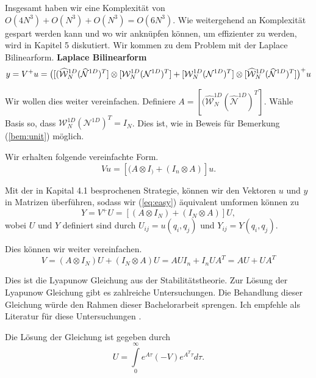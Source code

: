 Insgesamt haben wir eine Komplexität von $O(4N^3)+O(N^3)+O(N^3)=O(6N^3)$.
Wie weitergehend an Komplexität gespart werden kann und wo wir anknüpfen können, um effizienter zu werden, wird in Kapitel 5 diskutiert.
Wir kommen zu dem Problem mit der Laplace Bilinearform.
\vspace*{1cm}
\textbf{Laplace Bilinearform}
\begin{equation*}
y=V^{+}u = \big{(} [(\widehat{\mathcal{W}}_N^{1D} (\widehat{\mathcal{N}}^{1D})^T] \otimes [\mathcal{W}_N^{1D} (\mathcal{N}^{1D})^T]  +  [\mathcal{W}_N^{1D} (\mathcal{N}^{1D})^T] \otimes [\widehat{\mathcal{W}}_N^{1D} (\widehat{\mathcal{N}}^{1D})^T]  \big{)}^+ u
\end{equation*}

Wir wollen dies weiter vereinfachen. Definiere $A=[(\widehat{\mathcal{W}}_N^{1D} (\widehat{\mathcal{N}}^{1D})^T]$. Wähle Basis so, dass $\mathcal{W}_N^{1D} (\mathcal{N}^{1D})^T  = I_N$. Dies ist, wie in Beweis für Bemerkung (\ref{bem:unit}) möglich.

Wir erhalten folgende vereinfachte Form.
\begin{equation*} \label{eq:easy}
Vu =[(A \otimes I_) + (I_n \otimes A)]u.
\end{equation*}

Mit der in Kapital 4.1 besprochenen Strategie, können wir den Vektoren $u$ und $y$ in Matrizen überführen, sodass wir (\ref{eq:easy}) äquivalent umformen können zu
\begin{equation*} \label{eq:easy}
Y=V^{+}U =[(A \otimes I_N) + (I_N \otimes A)]U,
\end{equation*}
wobei $U$  und $Y$ definiert sind durch $U_{ij}=u(q_i,q_j)$ und $Y_{ij}=Y(q_i,q_j)$.

Dies können wir weiter vereinfachen.
\begin{equation*} \label{eq:easy}
V=(A \otimes I_N)U + (I_N \otimes A)U = AUI_n + I_n U A^T = AU + UA^T
\end{equation*}

Dies ist die Lyapunow Gleichung aus der Stabilitätstheorie. Zur Lösung der Lyapunow Gleichung gibt es zahlreiche Untersuchungen. Die Behandlung dieser Gleichung würde den Rahmen dieser Bachelorarbeit sprengen. Ich empfehle als Literatur für diese Untersuchungen \cite{Lyapunov}.

Die Lösung der Gleichung ist gegeben durch
\begin{equation*}
U = \int\limits_{0}^{\infty} e^{A \tau} (-V) e^{A^T \tau} d\tau.
\end{equation*}

